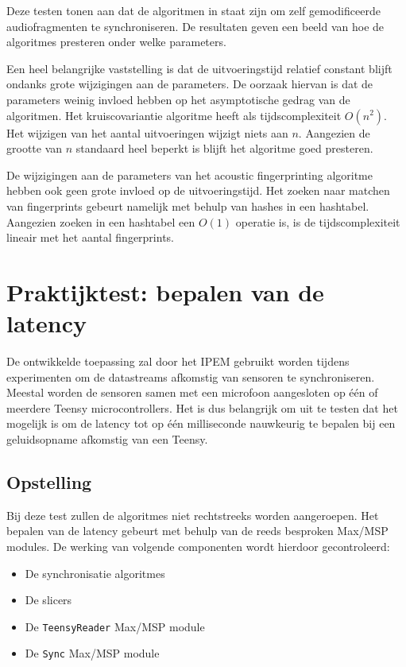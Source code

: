 Deze testen tonen aan dat de algoritmen in staat zijn om zelf gemodificeerde audiofragmenten te synchroniseren. De resultaten geven een beeld van hoe de algoritmes presteren onder welke parameters.

Een heel belangrijke vaststelling is dat de uitvoeringstijd relatief constant blijft ondanks grote wijzigingen aan de parameters. De oorzaak hiervan is dat de parameters weinig invloed hebben op het asymptotische gedrag van de algoritmen. Het kruiscovariantie algoritme heeft als tijdscomplexiteit $ O(n^{2}) $. Het wijzigen van het aantal uitvoeringen wijzigt niets aan $ n $. Aangezien de grootte van $ n $ standaard heel beperkt is blijft het algoritme goed presteren.

De wijzigingen aan de parameters van het acoustic fingerprinting algoritme hebben ook geen grote invloed op de uitvoeringstijd. Het zoeken naar matchen van fingerprints gebeurt namelijk met behulp van hashes in een hashtabel. Aangezien zoeken in een hashtabel een $ O(1) $ operatie is, is de tijdscomplexiteit lineair met het aantal fingerprints.

\section{Praktijktest: bepalen van de latency}
\label{praktijktest}

De ontwikkelde toepassing zal door het IPEM gebruikt worden tijdens experimenten om de datastreams afkomstig van sensoren te synchroniseren. Meestal worden de sensoren samen met een microfoon aangesloten op één of meerdere Teensy microcontrollers. Het is dus belangrijk om uit te testen dat het mogelijk is om de latency tot op één milliseconde nauwkeurig te bepalen bij een geluidsopname afkomstig van een Teensy.

\subsection{Opstelling}

Bij deze test zullen de algoritmes niet rechtstreeks worden aangeroepen. Het bepalen van de latency gebeurt met behulp van de reeds besproken Max/MSP modules. De werking van volgende componenten wordt hierdoor gecontroleerd:
\begin{itemize}[noitemsep]
	\item De synchronisatie algoritmes
	\item De slicers
	\item De \texttt{TeensyReader} Max/MSP module
	\item De \texttt{Sync} Max/MSP module
\end{itemize}

